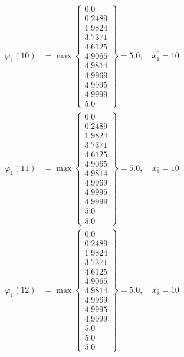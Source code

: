\documentclass{article}
\begin{document}
\begin{align*}
  
  
  
\varphi_{1}(10) &= \max \left\{ \begin{array}{c}
0.0 \\
 0.2489 \\
 1.9824 \\
 3.7371 \\
 4.6125 \\
 4.9065 \\
 4.9814 \\
 4.9969 \\
 4.9995 \\
 4.9999 \\
 5.0
\end{array} \right\}=5.0,\quad x_{1}^0=10\\
  
  
  
  
\varphi_{1}(11) &= \max \left\{ \begin{array}{c}
0.0 \\
 0.2489 \\
 1.9824 \\
 3.7371 \\
 4.6125 \\
 4.9065 \\
 4.9814 \\
 4.9969 \\
 4.9995 \\
 4.9999 \\
 5.0 \\
 5.0
\end{array} \right\}=5.0,\quad x_{1}^0=10\\
  
  
  
  
\varphi_{1}(12) &= \max \left\{ \begin{array}{c}
0.0 \\
 0.2489 \\
 1.9824 \\
 3.7371 \\
 4.6125 \\
 4.9065 \\
 4.9814 \\
 4.9969 \\
 4.9995 \\
 4.9999 \\
 5.0 \\
 5.0 \\
 5.0
\end{array} \right\}=5.0,\quad x_{1}^0=10\\
  
  
  

\end{align*}
\end{document}
